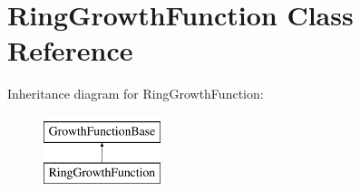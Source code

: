 \hypertarget{classRingGrowthFunction}{}\section{Ring\+Growth\+Function Class Reference}
\label{classRingGrowthFunction}
Inheritance diagram for Ring\+Growth\+Function\+:\begin{figure}[H]
\begin{center}
\leavevmode
\includegraphics[height=2.000000cm]{classRingGrowthFunction}
\end{center}
\end{figure}
